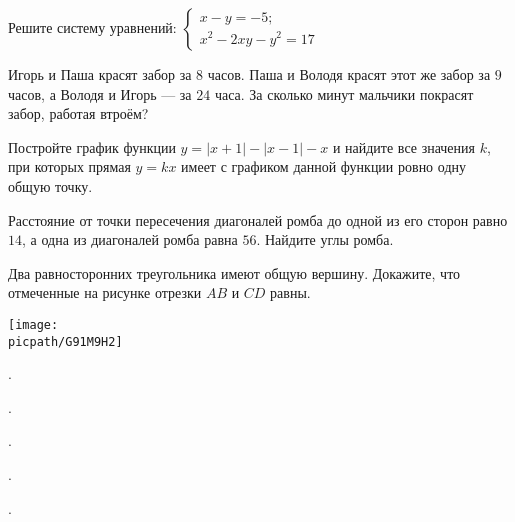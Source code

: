 \begin{homework}[number=2]
	\begin{listofex}
		\item Решите систему уравнений: \( \begin{cases} x-y=-5; \\ x^2-2xy-y^2=17 \end{cases} \)
		\item Игорь и Паша красят забор за \( 8 \) часов. Паша и Володя красят этот же забор за \( 9 \) часов, а Володя и Игорь --- за \( 24 \) часа. За сколько минут мальчики покрасят забор, работая втроём?
		\item Постройте график функции \( y=|x+1|-|x-1|-x \) и найдите все значения \( k \), при которых прямая \( y=kx \) имеет с графиком данной функции ровно одну общую точку.
		\item Расстояние от точки пересечения диагоналей ромба до одной из его сторон равно \( 14 \), а одна из диагоналей ромба равна \( 56 \). Найдите углы ромба.
		\item 
		\begin{minipage}[t]{\bodywidth}
			 Два равносторонних треугольника имеют общую вершину. Докажите, что отмеченные на рисунке отрезки \( AB \) и \( CD \) равны.
		\end{minipage}
		\gapwidth
		\begin{minipage}[t]{\picwidth}
			\texttt{[image: \\picpath/G91M9H2]}
		\end{minipage}
	\end{listofex}
\end{homework}

\begin{class}[number=5]
	\begin{listofex}
		\item .
	\end{listofex}
\end{class}

\begin{class}[number=6]
	\begin{listofex}
		\item .
	\end{listofex}
\end{class}

\begin{homework}[number=3]
	\begin{listofex}
		\item .
	\end{listofex}
\end{homework}

\begin{class}[number=7]
	\begin{listofex}
		\item .
	\end{listofex}
\end{class}

\begin{class}[number=8]
	\begin{listofex}
		\item .
	\end{listofex}
\end{class}
